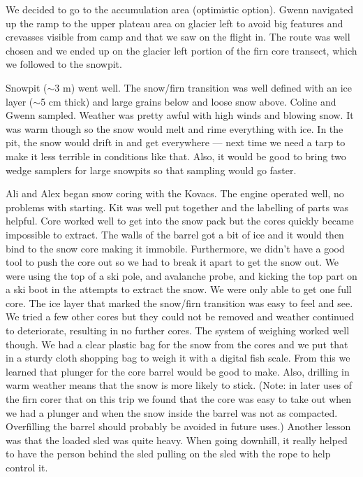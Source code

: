 \documentclass[12pt]{article}
\begin{document}
We decided to go to the accumulation area (optimistic option). Gwenn navigated up the ramp to the upper plateau area on glacier left to avoid big features and crevasses visible from camp and that we saw on the flight in. The route was well chosen and we ended up on the glacier left portion of the firn core transect, which we followed to the snowpit.

Snowpit ($\sim$3 m) went well. The snow/firn transition was well defined with an ice layer ($\sim$5 cm thick) and large grains below and loose snow above. Coline and Gwenn sampled. Weather was pretty awful with high winds and blowing snow. It was warm though so the snow would melt and rime everything with ice. In the pit, the snow would drift in and get everywhere --- next time we need a tarp to make it less terrible in conditions like that. Also, it would be good to bring two wedge samplers for large snowpits so that sampling would go faster. 

Ali and Alex began snow coring with the Kovacs. The engine operated well, no problems with starting. Kit was well put together and the labelling of parts was helpful. Core worked well to get into the snow pack but the cores quickly became impossible to extract. The walls of the barrel got a bit of ice and it would then bind to the snow core making it immobile. Furthermore, we didn't have a good tool to push the core out so we had to break it apart to get the snow out. We were using the top of a ski pole, and avalanche probe, and kicking the top part on a ski boot in the attempts to extract the snow. We were only able to get one full core. The ice layer that marked the snow/firn transition was easy to feel and see. We tried a few other cores but they could not be removed and weather continued to deteriorate, resulting in no further cores. The system of weighing worked well though. We had a clear plastic bag for the snow from the cores and we put that in a sturdy cloth shopping bag to weigh it with a digital fish scale.  From this we learned that plunger for the core barrel would be good to make. Also, drilling in warm weather means that the snow is more likely to stick. (Note: in later uses of the firn corer that on this trip we found that the core was easy to take out when we had a plunger and when the snow inside the barrel was not as compacted. Overfilling the barrel should probably be avoided in future uses.) Another lesson was that the loaded sled was quite heavy. When going downhill, it really helped to have the person behind the sled pulling on the sled with the rope to help control it. 
\end{document}

